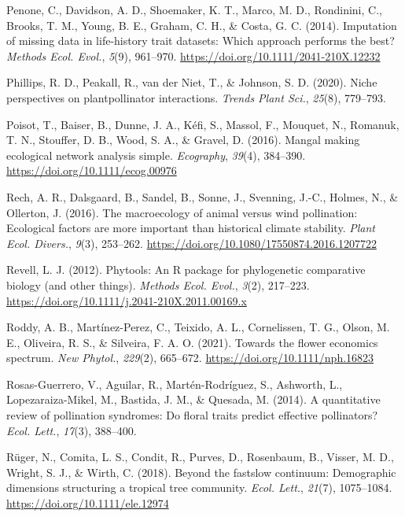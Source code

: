 \documentclass[
  12pt,
  a4paper,
]{article}
\newlength{\cslhangindent}
\newlength{\cslentryspacingunit} %
\newenvironment{CSLReferences}[2] %
 {%
  \setlength{\parindent}{0pt}
  \ifodd #1
  \let\oldpar\par
  \def\par{\hangindent=\cslhangindent\oldpar}
  \fi
  \setlength{\parskip}{#2\cslentryspacingunit}
 }%
 {}
\begin{document}
\begin{CSLReferences}{1}{0}
\leavevmode{}%
Penone, C., Davidson, A. D., Shoemaker, K. T., Marco, M. D., Rondinini, C., Brooks, T. M., Young, B. E., Graham, C. H., \& Costa, G. C. (2014). Imputation of missing data in life-history trait datasets: Which approach performs the best? \emph{Methods Ecol. Evol.}, \emph{5}(9), 961--970. \url{https://doi.org/10.1111/2041-210X.12232}

\leavevmode{}%
Phillips, R. D., Peakall, R., van der Niet, T., \& Johnson, S. D. (2020). Niche perspectives on plant\textendash pollinator interactions. \emph{Trends Plant Sci.}, \emph{25}(8), 779--793.

\leavevmode{}%
Poisot, T., Baiser, B., Dunne, J. A., Kéfi, S., Massol, F., Mouquet, N., Romanuk, T. N., Stouffer, D. B., Wood, S. A., \& Gravel, D. (2016). Mangal \textendash{} making ecological network analysis simple. \emph{Ecography}, \emph{39}(4), 384--390. \url{https://doi.org/10.1111/ecog.00976}

\leavevmode{}%
Rech, A. R., Dalsgaard, B., Sandel, B., Sonne, J., Svenning, J.-C., Holmes, N., \& Ollerton, J. (2016). The macroecology of animal versus wind pollination: Ecological factors are more important than historical climate stability. \emph{Plant Ecol. Divers.}, \emph{9}(3), 253--262. \url{https://doi.org/10.1080/17550874.2016.1207722}

\leavevmode{}%
Revell, L. J. (2012). Phytools: An {R} package for phylogenetic comparative biology (and other things). \emph{Methods Ecol. Evol.}, \emph{3}(2), 217--223. \url{https://doi.org/10.1111/j.2041-210X.2011.00169.x}

\leavevmode{}%
Roddy, A. B., Martínez-Perez, C., Teixido, A. L., Cornelissen, T. G., Olson, M. E., Oliveira, R. S., \& Silveira, F. A. O. (2021). Towards the flower economics spectrum. \emph{New Phytol.}, \emph{229}(2), 665--672. \url{https://doi.org/10.1111/nph.16823}

\leavevmode{}%
Rosas-Guerrero, V., Aguilar, R., Martén-Rodríguez, S., Ashworth, L., Lopezaraiza-Mikel, M., Bastida, J. M., \& Quesada, M. (2014). A quantitative review of pollination syndromes: Do floral traits predict effective pollinators? \emph{Ecol. Lett.}, \emph{17}(3), 388--400.

\leavevmode{}%
Rüger, N., Comita, L. S., Condit, R., Purves, D., Rosenbaum, B., Visser, M. D., Wright, S. J., \& Wirth, C. (2018). Beyond the fast\textendash slow continuum: Demographic dimensions structuring a tropical tree community. \emph{Ecol. Lett.}, \emph{21}(7), 1075--1084. \url{https://doi.org/10.1111/ele.12974}


\end{CSLReferences}
\end{document}
